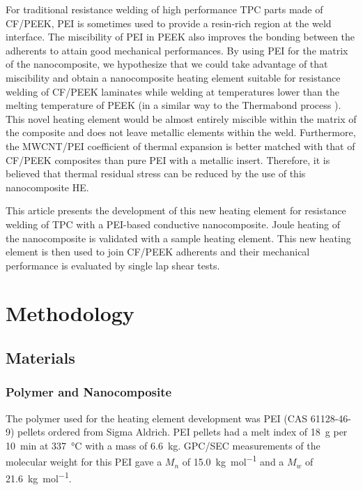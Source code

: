 For traditional resistance welding of high performance TPC parts made of CF/PEEK, PEI is sometimes used to provide a resin-rich region at the weld interface. 
The miscibility of PEI in PEEK \cite{Crevecoeur1991} also improves the bonding between the adherents to attain good mechanical performances. 
By using PEI for the matrix of the nanocomposite, we hypothesize that we could take advantage of that miscibility and obtain a nanocomposite heating element suitable for resistance welding of CF/PEEK laminates while welding at temperatures lower than the melting temperature of PEEK (in a similar way to the Thermabond process \cite{Smiley1991a}). 
This novel heating element would be almost entirely miscible within the matrix of the composite and does not leave metallic elements within the weld. 
Furthermore, the MWCNT/PEI coefficient of thermal expansion is better matched with that of CF/PEEK composites than pure PEI with a metallic insert. 
Therefore, it is believed that thermal residual stress can be reduced by the use of this nanocomposite HE. 

This article presents the development of this new heating element for resistance welding of TPC with a PEI-based conductive nanocomposite. 
Joule heating of the nanocomposite is validated with a sample heating element. 
This new heating element is then used to join CF/PEEK adherents and their mechanical performance is evaluated by single lap shear tests. 

\section{Methodology}

\subsection{Materials}

\subsubsection{Polymer and Nanocomposite}

The polymer used for the heating element development was PEI (CAS 61128-46-9) pellets ordered from Sigma Aldrich. 
PEI pellets had a melt index of \SI{18}{\gram} per \SI{10}{\minute} at \SI{337}{\celsius} with a mass of \SI{6.6}{\kilogram}. 
GPC/SEC measurements of the molecular weight for this PEI gave a $M_n$ of \SI{15.0}{\kg\per\mol} and a $M_w$ of \SI{21.6}{\kg\per\mol}. 


